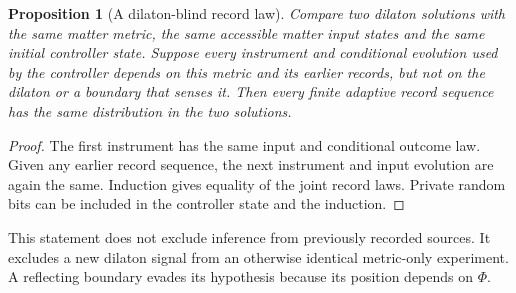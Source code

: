 \documentclass[12pt,a4paper]{article}
\newtheorem{proposition}[theorem]{Proposition}
\begin{document}
\begin{proposition}[A dilaton-blind record law]\label{prop:blind-readback}
Compare two dilaton solutions with the same matter metric, the same accessible
matter input states and the same initial controller state. Suppose every
instrument and conditional evolution used by the controller depends on this
metric and its earlier records, but not on the dilaton or a boundary that senses
it. Then every finite adaptive record sequence has the same distribution in the
two solutions.
\end{proposition}
\begin{proof}
The first instrument has the same input and conditional outcome law. Given
any earlier record sequence, the next instrument and input evolution are again
the same. Induction gives equality of the joint record laws. Private random bits
can be included in the controller state and the induction.
\end{proof}
This statement does not exclude inference from previously recorded sources.
It excludes a new dilaton signal from an otherwise identical metric-only
experiment. A reflecting boundary evades its hypothesis because its position
depends on $\Phi$.
\end{document}
